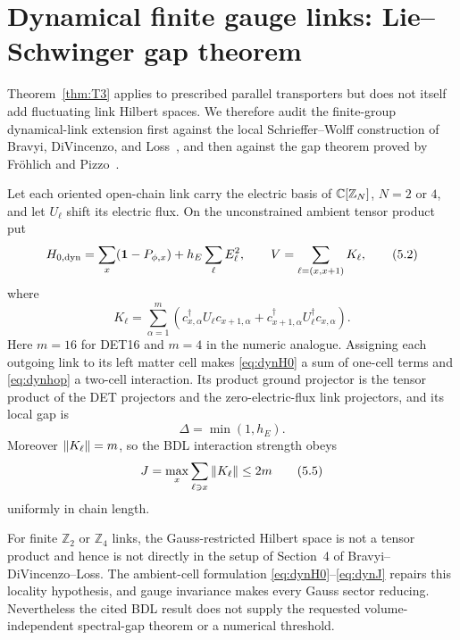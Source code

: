 \section{Dynamical finite gauge links: Lie--Schwinger gap theorem}
\label{sec:dynlinks}

Theorem~\ref{thm:T3} applies to prescribed parallel transporters but does
not itself add fluctuating link Hilbert spaces.  We therefore audit the
finite-group dynamical-link extension first against the local
Schrieffer--Wolff construction of Bravyi, DiVincenzo, and
Loss~\cite{BDL2011}, and then against the gap theorem proved by
Fröhlich and Pizzo~\cite{FP2020}.

Let each oriented open-chain link carry the electric basis of
$\mathbb C[\mathbb Z_N]$, $N=2$ or $4$, and let $U_\ell$ shift its electric
flux.  On the unconstrained ambient tensor product put
\[
 H_{0,\mathrm{dyn}}
 =\sum_x(\mathbf 1-P_{\phi,x})+h_E\sum_\ell E_\ell^2,\qquad
 V=\sum_{\ell=(x,x+1)}K_\ell ,
\tag{5.2}\label{eq:dynH0}
\]
where
\[
 K_\ell=\sum_{\alpha=1}^{m}
 \left(c^\dagger_{x,\alpha}U_\ell c_{x+1,\alpha}
 +c^\dagger_{x+1,\alpha}U_\ell^\dagger c_{x,\alpha}\right).
\tag{5.3}\label{eq:dynhop}
\]
Here $m=16$ for DET16 and $m=4$ in the numeric analogue.  Assigning each
outgoing link to its left matter cell makes \eqref{eq:dynH0} a sum of
one-cell terms and \eqref{eq:dynhop} a two-cell interaction.  Its product
ground projector is the tensor product of the DET projectors and the
zero-electric-flux link projectors, and its local gap is
\[
 \Delta=\min(1,h_E).
\tag{5.4}\label{eq:dyndelta}
\]
Moreover $\left\lVert K_\ell\right\rVert=m$, so the BDL interaction strength obeys
\[
 J=\max_x\sum_{\ell\ni x}\left\lVert K_\ell\right\rVert\leq2m
\tag{5.5}\label{eq:dynJ}
\]
uniformly in chain length.

\begin{proposition}
\label{prop:BDLaudit}
For finite $\mathbb Z_2$ or $\mathbb Z_4$ links, the Gauss-restricted
Hilbert space is not a tensor product and hence is not directly in the
setup of Section~4 of Bravyi--DiVincenzo--Loss.  The ambient-cell
formulation \eqref{eq:dynH0}--\eqref{eq:dynJ} repairs this locality
hypothesis, and gauge invariance makes every Gauss sector reducing.
Nevertheless the cited BDL result does not supply the requested
volume-independent spectral-gap theorem or a numerical threshold.
\end{proposition}

